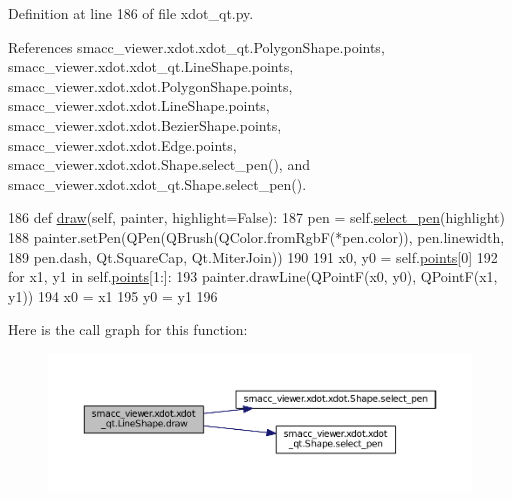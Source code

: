 Definition at line 186 of file xdot\+\_\+qt.\+py.



References smacc\+\_\+viewer.\+xdot.\+xdot\+\_\+qt.\+Polygon\+Shape.\+points, smacc\+\_\+viewer.\+xdot.\+xdot\+\_\+qt.\+Line\+Shape.\+points, smacc\+\_\+viewer.\+xdot.\+xdot.\+Polygon\+Shape.\+points, smacc\+\_\+viewer.\+xdot.\+xdot.\+Line\+Shape.\+points, smacc\+\_\+viewer.\+xdot.\+xdot.\+Bezier\+Shape.\+points, smacc\+\_\+viewer.\+xdot.\+xdot.\+Edge.\+points, smacc\+\_\+viewer.\+xdot.\+xdot.\+Shape.\+select\+\_\+pen(), and smacc\+\_\+viewer.\+xdot.\+xdot\+\_\+qt.\+Shape.\+select\+\_\+pen().


\begin{DoxyCode}
186     \textcolor{keyword}{def }\hyperlink{classsmacc__viewer_1_1xdot_1_1xdot__qt_1_1LineShape_a041baad9cafc4a10da363b4c35bd875a}{draw}(self, painter, highlight=False):
187         pen = self.\hyperlink{classsmacc__viewer_1_1xdot_1_1xdot__qt_1_1Shape_a7f20c9ecdb3c6117b8d1185c8155b122}{select\_pen}(highlight)
188         painter.setPen(QPen(QBrush(QColor.fromRgbF(*pen.color)), pen.linewidth,
189                                             pen.dash, Qt.SquareCap, Qt.MiterJoin))
190 
191         x0, y0 = self.\hyperlink{classsmacc__viewer_1_1xdot_1_1xdot__qt_1_1LineShape_a815cd548c33d9d5b05f521cd6a9fa1ca}{points}[0]
192         \textcolor{keywordflow}{for} x1, y1 \textcolor{keywordflow}{in} self.\hyperlink{classsmacc__viewer_1_1xdot_1_1xdot__qt_1_1LineShape_a815cd548c33d9d5b05f521cd6a9fa1ca}{points}[1:]:
193             painter.drawLine(QPointF(x0, y0),  QPointF(x1, y1))
194             x0 = x1
195             y0 = y1
196 
\end{DoxyCode}


Here is the call graph for this function\+:
\nopagebreak
\begin{figure}[H]
\begin{center}
\leavevmode
\includegraphics[width=350pt]{classsmacc__viewer_1_1xdot_1_1xdot__qt_1_1LineShape_a041baad9cafc4a10da363b4c35bd875a_cgraph}
\end{center}
\end{figure}




